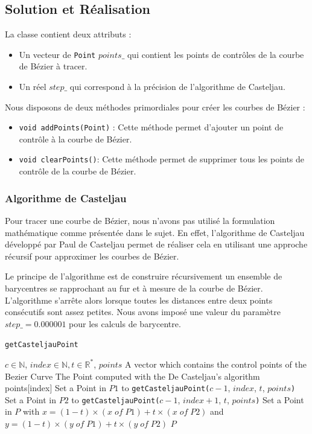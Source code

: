 \documentclass[a4paper, 12pt]{article}
\begin{document}
\subsection{Solution et Réalisation}
La classe contient deux attributs : 
\begin{itemize}
	\item Un vecteur de \texttt{Point} $points\_$ qui contient les points de contrôles de la courbe de Bézier à tracer.
 	\item Un réel $step\_$ qui correspond à la précision de l'algorithme de Casteljau.
\end{itemize}
\vspace*{0.5cm}
Nous disposons de deux méthodes primordiales pour créer les courbes de Bézier :
\begin{itemize}
\item \texttt{void addPoints(Point)} : Cette méthode permet d'ajouter un point de contrôle à la courbe de Bézier.
\item \texttt{void clearPoints()}: Cette méthode permet de supprimer tous les points de contrôle de la courbe de Bézier.
\end{itemize}

\subsubsection{Algorithme de Casteljau}
Pour tracer une courbe de Bézier, nous n'avons pas utilisé la formulation mathématique comme présentée dans le sujet. En effet, l’algorithme de Casteljau développé par Paul de Casteljau permet de réaliser cela en utilisant une approche récursif pour approximer les courbes de Bézier.

Le principe de l'algorithme est de construire récursivement un ensemble de barycentres se rapprochant au fur et à mesure de la courbe de Bézier. L'algorithme s'arrête alors lorsque toutes les distances entre deux points consécutifs sont assez petites.
Nous avons imposé une valeur du paramètre $step\_ = 0.000001$ pour les calculs de barycentre.

\begin{algorithm}
	\caption{\texttt{getCasteljauPoint}}
		\begin{algorithmic}[1]
		\Require $c \in \mathbb{N}$, $index \in \mathbb{N}, t \in \mathbb{R}^{*}$, $points$ A vector which contains the control points of the Bezier Curve
		\Ensure The Point computed with the De Casteljau's algorithm
			\State \Return points[index] 
		\EndIf
		\State Set a Point in $P1$ to \texttt{getCasteljauPoint(}$c-1$, $index$, $t$, $points$\texttt{)} 
		\State Set a Point in $P2$ to \texttt{getCasteljauPoint(}$c-1$, $index+1$, $t$, $points$\texttt{)} 
		\State Set a Point in $P$ with $x = (1-t) \times (x \; of \; P1) + t \times (x \; of \; P2)$ and $y = (1-t) \times (y \; of \; P1) + t \times (y \; of \; P2)$
		\State \Return $P$
		\EndFunction
		\end{algorithmic}
\end{algorithm}
\end{document}
